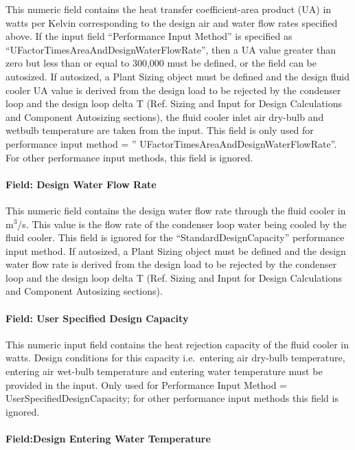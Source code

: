 This numeric field contains the heat transfer coefficient-area product (UA) in watts per Kelvin corresponding to the design air and water flow rates specified above. If the input field ``Performance Input Method'' is specified as ``UFactorTimesAreaAndDesignWaterFlowRate'', then a UA value greater than zero but less than or equal to 300,000 must be defined, or the field can be autosized. If autosized, a Plant Sizing object must be defined and the design fluid cooler UA value is derived from the design load to be rejected by the condenser loop and the design loop delta T (Ref. Sizing and Input for Design Calculations and Component Autosizing sections), the fluid cooler inlet air dry-bulb and wetbulb temperature are taken from the input. This field is only used for performance input method = '' UFactorTimesAreaAndDesignWaterFlowRate''. For other performance input methods, this field is ignored.

\paragraph{Field: Design Water Flow Rate}\label{field-design-water-flow-rate-4}

This numeric field contains the design water flow rate through the fluid cooler in m\(^{3}\)/s. This value is the flow rate of the condenser loop water being cooled by the fluid cooler. This field is ignored for the ``StandardDesignCapacity'' performance input method. If autosized, a Plant Sizing object must be defined and the design water flow rate is derived from the design load to be rejected by the condenser loop and the design loop delta T (Ref. Sizing and Input for Design Calculations and Component Autosizing sections).

\paragraph{Field: User Specified Design Capacity}\label{field-user-specified-design-capacity}

This numeric input field contains the heat rejection capacity of the fluid cooler in watts. Design conditions for this capacity i.e.~entering air dry-bulb temperature, entering air wet-bulb temperature and entering water temperature must be provided in the input. Only used for Performance Input Method = UserSpecifiedDesignCapacity; for other performance input methods this field is ignored.

\paragraph{Field:Design Entering Water Temperature}\label{fielddesign-entering-water-temperature}

